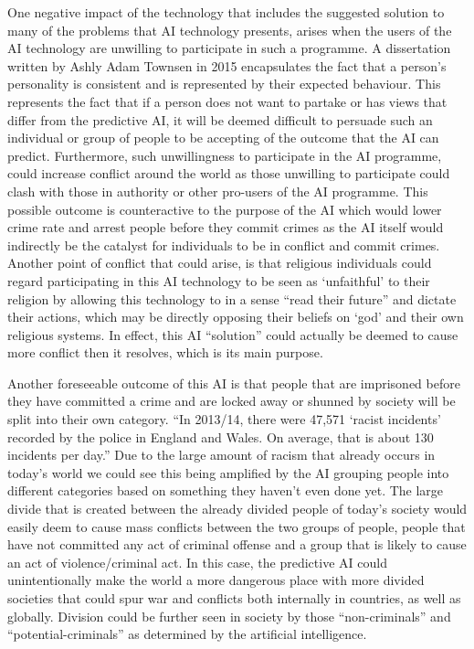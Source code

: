\documentclass{article}
\begin{document}
One negative impact of the technology that includes the suggested solution to many of the problems that AI technology presents, arises when the users of the AI technology are unwilling to participate in such a programme. A dissertation written by Ashly Adam Townsen in 2015 \cite{townsen_2015} encapsulates the fact that a person's personality is consistent and is represented by their expected behaviour. This represents the fact that if a person does not want to partake or has views that differ from the predictive AI, it will be deemed difficult to persuade such an individual or group of people to be accepting of the outcome that the AI can predict. Furthermore, such unwillingness to participate in the AI programme, could increase conflict around the world as those unwilling to participate could clash with those in authority or other pro-users of the AI programme. This possible outcome is counteractive to the purpose of the AI which would lower crime rate and arrest people before they commit crimes as the AI itself would indirectly be the catalyst for individuals to be in conflict and commit crimes. Another point of conflict that could arise, is that religious individuals could regard participating in this AI technology to be  seen as ‘unfaithful’ to their religion by allowing this technology to in a sense “read their future” and dictate their actions, which may be directly opposing their beliefs on ‘god’ and their own religious systems. In effect, this AI “solution” could actually be deemed to cause more conflict then it resolves, which is its main purpose. 

Another foreseeable outcome of this AI is that people that are imprisoned before they have committed a crime and are locked away or shunned by society will be split into their own category. “In 2013/14, there were 47,571 ‘racist incidents’ recorded by the police in England and Wales. On average, that is about 130 incidents per day.” \cite{institute-of-race-relations} Due to the large amount of racism that already occurs in today's world we could see this being amplified by the AI grouping people into different categories based on something they haven't even done yet. The large divide that is created between the already divided people of today's society would easily deem to cause mass conflicts between the two groups of people, people that have not committed any act of criminal offense and a group that is likely to cause an act of violence/criminal act.  In this case, the predictive AI could unintentionally make the world a more dangerous place with more divided societies that could spur war and conflicts both internally in countries, as well as globally.  Division could be further seen in society by those “non-criminals” and “potential-criminals” as determined by the artificial intelligence.
\end{document}
